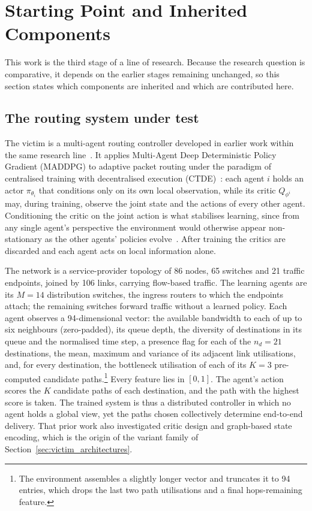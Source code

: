 \section{Starting Point and Inherited Components}
\label{sec:starting_point}

This work is the third stage of a line of research. Because the research question is
comparative, it depends on the earlier stages remaining unchanged, so this section
states which components are inherited and which are contributed here.

\subsection{The routing system under test}
\label{subsec:base_system}

The victim is a multi-agent routing controller developed in earlier work within the
same research line~\cite{amaral2026maddpg-routing}. It applies Multi-Agent Deep
Deterministic Policy Gradient (MADDPG) to adaptive packet routing under the
paradigm of centralised training with decentralised execution
(CTDE)~\cite{lowe2017multi}: each agent $i$ holds an actor $\pi_{\theta_i}$ that
conditions only on its own local observation, while its critic $Q_{\phi^i}$ may,
during training, observe the joint state and the actions of every other agent.
Conditioning the critic on the joint action is what stabilises learning, since from
any single agent's perspective the environment would otherwise appear
non-stationary as the other agents' policies evolve~\cite{lowe2017multi}. After
training the critics are discarded and each agent acts on local information alone.

The network is a service-provider topology of 86 nodes, 65 switches and 21 traffic
endpoints, joined by 106 links, carrying flow-based traffic. The learning agents are
its $M = 14$ distribution switches, the ingress routers to which the endpoints attach;
the remaining switches forward traffic without a learned policy. Each agent observes a
94-dimensional vector: the available bandwidth to each of up to six neighbours
(zero-padded), its queue depth, the diversity of destinations in its queue and the
normalised time step, a presence flag for each of the $n_d = 21$ destinations, the
mean, maximum and variance of its adjacent link utilisations, and, for every
destination, the bottleneck utilisation of each of its $K = 3$ pre-computed candidate
paths.\footnote{The environment assembles a slightly longer vector and truncates it to
94 entries, which drops the last two path utilisations and a final hops-remaining
feature.} Every feature lies in $[0,1]$. The agent's action scores the $K$ candidate
paths of each destination, and the path with the highest score is taken. The trained
system is thus a distributed controller in which no agent holds a global view, yet the
paths chosen collectively determine end-to-end delivery. That prior work also
investigated critic design and graph-based state encoding, which is the origin of the
variant family of Section~\ref{sec:victim_architectures}.

